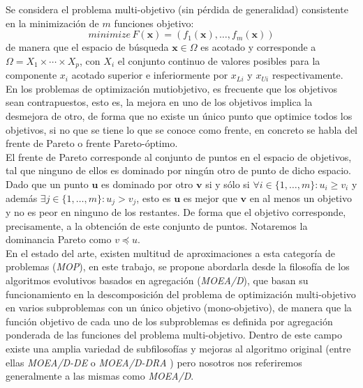 \justify

Se considera el problema multi-objetivo (sin pérdida de generalidad) consistente en la minimización de $m$ funciones objetivo: $$minimize \, F(\boldsymbol{x})=(f_1(\boldsymbol{x}), \dots, f_m(\boldsymbol{x}))$$ de manera que el espacio de búsqueda $\boldsymbol{x} \in \Omega$ es acotado y corresponde a $\Omega = X_1 \times \cdots \times X_p$, con $X_i$ el conjunto continuo de valores posibles para la componente $x_i$ acotado superior e inferiormente por $x_{Li}$ y $x_{Ui}$ respectivamente.\\

En los problemas de optimización mutiobjetivo, es frecuente que los objetivos sean contrapuestos, esto es, la mejora en uno de los objetivos implica la desmejora de otro, de forma que no existe un único punto que optimice todos los objetivos, si no que se tiene lo que se conoce como frente, en concreto se habla del frente de Pareto o frente Pareto-óptimo.\\

El frente de Pareto corresponde al conjunto de puntos en el espacio de objetivos, tal que ninguno de ellos es dominado por ningún otro de punto de dicho espacio. Dado que un punto $\boldsymbol{u}$ es dominado por otro $\boldsymbol{v}$ si y sólo si $\forall i \in \{1, \dots, m \}: u_i \geq v_i$ y además $\exists j \in \{1, \dots, m\}: u_j > v_j$, esto es $\boldsymbol{u}$ es mejor que $\boldsymbol{v}$ en al menos un objetivo y no es peor en ninguno de los restantes. De forma que el objetivo corresponde, precisamente, a la obtención de este conjunto de puntos. Notaremos la dominancia Pareto como $v \preceq u$.\\

En el estado del arte, existen multitud de aproximaciones a esta categoría de problemas (\textit{MOP}), en este trabajo, se propone abordarla desde la filosofía de los algoritmos evolutivos basados en agregación (\textit{MOEA/D}), que basan su funcionamiento en la descomposición del problema de optimización multi-objetivo en varios subproblemas con un único objetivo (mono-objetivo), de manera que la función objetivo de cada uno de los subproblemas es definida por agregación ponderada de las funciones del problema multi-objetivo. Dentro de este campo existe una amplia variedad de subfilosofías y mejoras al algoritmo original (entre ellas \textit{MOEA/D-DE} \cite{Li2009} o \textit{MOEA/D-DRA} \cite{Qingfu2009}) pero nosotros nos referiremos generalmente a las mismas como \textit{MOEA/D}.\\

